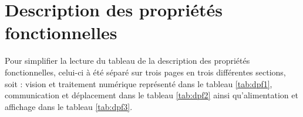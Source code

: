 

\chapter{Description des propriétés fonctionnelles}
\label{s:fonctionnelles}
Pour simplifier la lecture du tableau de la description des propriétés fonctionnelles, celui-ci à été séparé sur trois pages en trois différentes sections, soit : vision et traitement numérique représenté dans le tableau \ref{tab:dpf1}, communication et déplacement dans le tableau \ref{tab:dpf2} ainsi qu'alimentation et affichage dans le tableau \ref{tab:dpf3}. 
